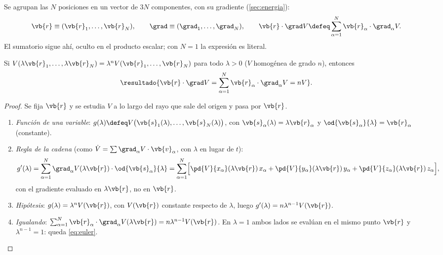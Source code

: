\begin{notacion}
\label{not:configuracion}
Se agrupan las $N$ posiciones en un vector de $3N$ componentes, con su gradiente
(\cref{sec:energia}):
\begin{equation}
  \vb{r}\equiv(\vb{r}_{1},\dots,\vb{r}_{N}),\qquad \grad\equiv(\grad_{1},\dots,\grad_{N}),\qquad
  \vb{r}\cdot\grad V\defeq\sa\vb{r}_{\alpha}\cdot\grad_{\alpha}V .
\end{equation}
El sumatorio sigue ahí, oculto en el producto escalar; con $N=1$ la expresión es literal.
\end{notacion}

\begin{lema}
\label{lem:euler}
Si $V(\lambda\vb{r}_{1},\dots,\lambda\vb{r}_{N})=\lambda^{n}V(\vb{r}_{1},\dots,\vb{r}_{N})$ para todo $\lambda>0$
($V$ homogénea de grado $n$), entonces
\begin{equation}
  \resultado{\vb{r}\cdot\grad V=\sa\vb{r}_{\alpha}\cdot\grad_{\alpha}V=nV} .
  \label{eq:euler}
\end{equation}
\end{lema}

\begin{proof}
Se fija $\vb{r}$ y se estudia $V$ a lo largo del rayo que sale del origen y pasa por $\vb{r}$.
\begin{enumerate}
  \item \emph{Función de una variable}:
  $g(\lambda)\defeq V\bigl(\vb{s}_{1}(\lambda),\dots,\vb{s}_{N}(\lambda)\bigr)$, con
  $\vb{s}_{\alpha}(\lambda)=\lambda\vb{r}_{\alpha}$ y $\od{\vb{s}_{\alpha}}{\lambda}=\vb{r}_{\alpha}$ (constante).
  \item \emph{Regla de la cadena} (como $\dot V=\sum\grad_{\alpha}V\cdot\vb{v}_{\alpha}$, con $\lambda$ en lugar de $t$):
  \[
    g'(\lambda)=\sa\grad_{\alpha}V(\lambda\vb{r})\cdot\od{\vb{s}_{\alpha}}{\lambda}
    =\sa\Bigl[\pd{V}{x_{\alpha}}(\lambda\vb{r})\,x_{\alpha}+\pd{V}{y_{\alpha}}(\lambda\vb{r})\,y_{\alpha}+\pd{V}{z_{\alpha}}(\lambda\vb{r})\,z_{\alpha}\Bigr],
  \]
  con el gradiente evaluado en $\lambda\vb{r}$, no en $\vb{r}$.
  \item \emph{Hipótesis}: $g(\lambda)=\lambda^{n}V(\vb{r})$, con $V(\vb{r})$ constante respecto de $\lambda$, luego
  $g'(\lambda)=n\lambda^{n-1}V(\vb{r})$.
  \item \emph{Igualando}: $\sa\vb{r}_{\alpha}\cdot\grad_{\alpha}V(\lambda\vb{r})=n\lambda^{n-1}V(\vb{r})$. En $\lambda=1$ ambos lados
  se evalúan en el mismo punto $\vb{r}$ y $\lambda^{n-1}=1$: queda \eqref{eq:euler}.\qedhere
\end{enumerate}
\end{proof}

